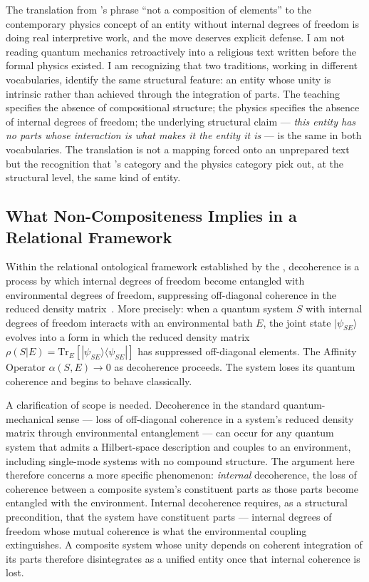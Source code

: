 The translation from \AbdulBaha's phrase ``not a composition of elements''
to the contemporary physics concept of an entity without internal degrees
of freedom is doing real interpretive work, and the move deserves explicit
defense.
I am not reading quantum mechanics retroactively into a religious text
written before the formal physics existed.
I am recognizing that two traditions, working in different vocabularies,
identify the same structural feature: an entity whose unity is intrinsic
rather than achieved through the integration of parts.
The \bahai teaching specifies the absence of compositional structure;
the physics specifies the absence of internal degrees of freedom; the
underlying structural claim --- \emph{this entity has no parts whose
interaction is what makes it the entity it is} --- is the same in both
vocabularies.
The translation is not a mapping forced onto an unprepared text but the
recognition that \AbdulBaha's category and the physics category pick out,
at the structural level, the same kind of entity.

\subsection{What Non-Compositeness Implies in a Relational Framework}

Within the relational ontological framework established by the \RCF,
decoherence is a process by which internal degrees of freedom become entangled
with environmental degrees of freedom, suppressing off-diagonal coherence
in the reduced density matrix~\citep{Zurek2003}.
More precisely: when a quantum system $S$ with internal degrees of freedom
interacts with an environmental bath $E$, the joint state $|\psi_{SE}\rangle$
evolves into a form in which the reduced density matrix $\rho(S|E) = \text{Tr}_E[|\psi_{SE}\rangle\langle\psi_{SE}|]$
has suppressed off-diagonal elements.
The Affinity Operator $\alpha(S,E) \to 0$ as decoherence proceeds.
The system loses its quantum coherence and begins to behave classically.

A clarification of scope is needed.
Decoherence in the standard quantum-mechanical sense --- loss of
off-diagonal coherence in a system's reduced density matrix through
environmental entanglement --- can occur for any quantum system that
admits a Hilbert-space description and couples to an environment,
including single-mode systems with no compound structure.
The argument here therefore concerns a more specific phenomenon:
\emph{internal} decoherence, the loss of coherence between a composite
system's constituent parts as those parts become entangled with the
environment.
Internal decoherence requires, as a structural precondition, that the
system have constituent parts --- internal degrees of freedom whose
mutual coherence is what the environmental coupling extinguishes.
A composite system whose unity depends on coherent integration of
its parts therefore disintegrates as a unified entity once that
internal coherence is lost.

